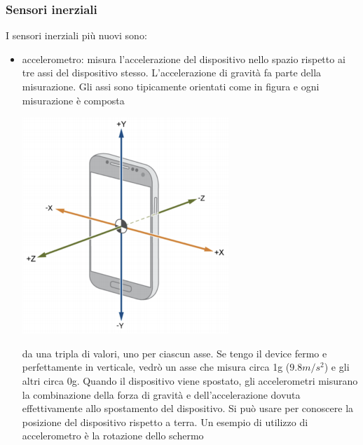 \subsubsection{Sensori inerziali}
\label{subsubsec: sensori inerziali}
I sensori inerziali più nuovi sono:
\begin{itemize}
    \item accelerometro: misura l'accelerazione del dispositivo nello spazio rispetto ai tre assi del dispositivo stesso. L'accelerazione di gravità fa parte della misurazione. 
    Gli assi sono tipicamente orientati come in figura e ogni misurazione è composta 
    
    \begin{minipage}{.4\textwidth}
      \includegraphics[width=\textwidth]{images/Mobile computing/1. Introduzione al Mobile Computing/accelerometro.PNG}
    \end{minipage} 
    \hfill
    \begin{minipage}{.5\textwidth}
        da una tripla di valori, uno per ciascun asse.
        Se tengo il device fermo e perfettamente in verticale, vedrò un asse che misura circa 1g (\begin{math} 9.8m/s^2 \end{math}) e gli altri circa 0g. Quando il dispositivo viene spostato, gli accelerometri misurano la combinazione della forza di gravità e dell'accelerazione dovuta effettivamente allo spostamento del dispositivo. Si può usare per conoscere la posizione del dispositivo rispetto a terra. Un esempio di utilizzo di accelerometro è la rotazione dello schermo
    \end{minipage}
    

\end{itemize}

